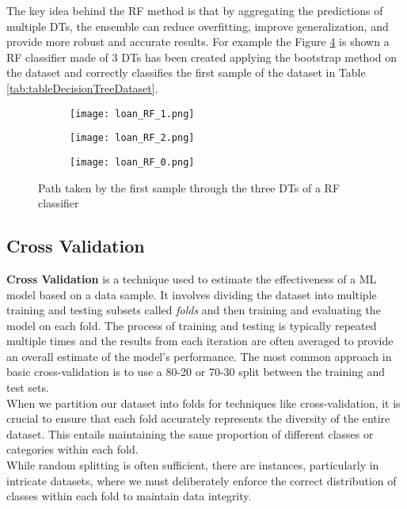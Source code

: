The key idea behind the RF method is that by aggregating the predictions of multiple DTs, the ensemble can reduce overfitting, improve generalization, and provide more robust and accurate results.
For example the Figure \ref{fig:rf} is shown a RF classifier made of 3 DTs has been created applying the bootstrap method on the dataset and correctly classifies the first sample of the dataset in Table \ref{tab:tableDecisionTreeDataset}.
\clearpage
\begin{figure}[H]
  \centering
  \begin{subfigure}{0.49\linewidth}
    \texttt{[image: loan\_RF\_1.png]}
    \caption{}
    \label{fig:rfTree0}
  \end{subfigure}
  \begin{subfigure}{0.49\linewidth}
    \texttt{[image: loan\_RF\_2.png]}
    \caption{}
    \label{fig:rfTree1}
  \end{subfigure}
  \begin{subfigure}{0.4\linewidth}
    \texttt{[image: loan\_RF\_0.png]}
    \caption{}
    \label{fig:rfTree2}
  \end{subfigure}
  \caption{Path taken by the first sample through the three DTs of a RF classifier}
  \label{fig:rf}
\end{figure}


\subsection{Cross Validation}
\label{subsec:cross_validation}

\textbf{Cross Validation} is a technique used to estimate the effectiveness of a ML model based on a data sample.
It involves dividing the dataset into multiple training and testing subsets called \textit{folds} and then training and evaluating the model on each fold.
The process of training and testing is typically repeated multiple times and the results from each iteration are often averaged to provide an overall estimate of the model's performance.
The most common approach in basic cross-validation is to use a 80-20 or 70-30 split between the training and test sets.\\
When we partition our dataset into folds for techniques like cross-validation, it is crucial to ensure that each fold accurately represents the diversity of the entire dataset. 
This entails maintaining the same proportion of different classes or categories within each fold.\\ 
While random splitting is often sufficient, there are instances, particularly in intricate datasets, where we must deliberately enforce the correct distribution of classes within each fold to maintain data integrity.
\\

